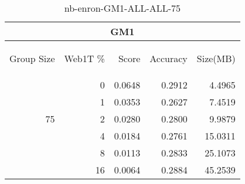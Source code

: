 \begin{center}
\begin{table}[htbp]
\begin{tabular}{ | r | r | r | r | r |}
\hline
\multicolumn{5}{|c|}{GM1}\\
\hline
\begin{sideways}Group Size\end{sideways} & \begin{sideways}Web1T \%\end{sideways} & \begin{sideways}Score\end{sideways} & \begin{sideways}Accuracy\end{sideways} & \begin{sideways}Size(MB)\end{sideways}\\
\hline
\multirow{5}{*}{75}
 & 0 & 0.0648 & 0.2912 & 4.4965\\ \cline{2-5}
 & 1 & 0.0353 & 0.2627 & 7.4519\\ \cline{2-5}
 & 2 & 0.0280 & 0.2800 & 9.9879\\ \cline{2-5}
 & 4 & 0.0184 & 0.2761 & 15.0311\\ \cline{2-5}
 & 8 & 0.0113 & 0.2833 & 25.1073\\ \cline{2-5}
 & 16 & 0.0064 & 0.2884 & 45.2539\\ \cline{2-5}
\hline
\end{tabular}
\caption{nb-enron-GM1-ALL-ALL-75}
\label{table:nb-enron-GM1-ALL-ALL-75}
\end{table}
\end{center}

